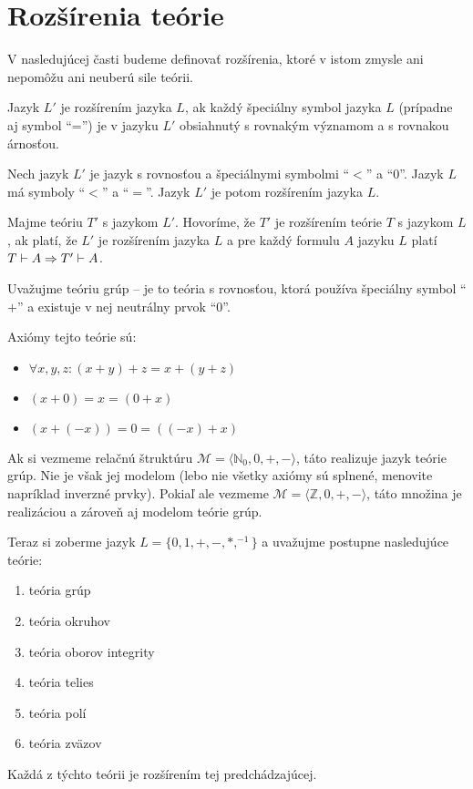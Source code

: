 \section{Rozšírenia teórie}

V nasledujúcej časti budeme definovať rozšírenia,
ktoré v istom zmysle ani nepomôžu ani
neuberú sile teórii.

\begin{definicia}
    Jazyk $L'$ je rozšírením jazyka $L$, ak každý
    špeciálny symbol jazyka $L$ (prípadne aj symbol ``='')
    je v jazyku $L'$ obsiahnutý s rovnakým významom a s rovnakou árnosťou.
\end{definicia}

\begin{priklad}
    Nech jazyk $L'$ je jazyk s rovnosťou a špeciálnymi symbolmi
    ``$<$'' a ``$0$''.
    Jazyk $L$ má symboly ``$<$'' a ``$=$''.
    Jazyk $L'$ je potom rozšírením jazyka $L$.
\end{priklad}    

\begin{definicia}
    Majme teóriu $T'$ s jazykom $L'$. Hovoríme, že $T'$ je
    rozšírením teórie $T$ s jazykom $L$, ak platí,
    že $L'$ je rozšírením jazyka $L$ a pre každý formulu $A$ jazyku $L$
    platí $T \vdash A \Rightarrow T' \vdash A$. 
\end{definicia}

\begin{priklad}
    Uvažujme teóriu grúp -- je to teória s rovnosťou, ktorá
    používa špeciálny symbol ``$+$'' a existuje v nej neutrálny prvok
    ``0''.
    
    Axiómy tejto teórie sú:
    \begin{itemize}
    \item $\forall x,y,z: (x+y)+z = x+(y+z)$
    \item $(x+0) = x = (0+x)$
    \item $(x+(-x)) = 0 = ((-x)+x)$
    \end{itemize}

    Ak si vezmeme relačnú štruktúru 
    $\mathcal{M}=\langle \mathbb{N}_0,0,+,- \rangle$,
    táto realizuje jazyk teórie grúp.
    Nie je však jej modelom (lebo nie všetky axiómy sú splnené, menovite
    napríklad inverzné prvky).
    Pokiaľ ale vezmeme $\mathcal{M}=\langle \mathbb{Z},0,+,- \rangle$,
    táto množina je realizáciou a zároveň aj modelom teórie grúp.  

    Teraz si zoberme jazyk $L = \{0,1,+,-,*, ^{-1}\}$
    a uvažujme postupne nasledujúce teórie:
    \begin{enumerate}
    \item teória grúp
    \item teória okruhov
    \item teória oborov integrity
    \item teória telies
    \item teória polí
    \item teória zväzov
    \end{enumerate}
    Každá z týchto teórii je rozšírením tej predchádzajúcej.
\end{priklad}

